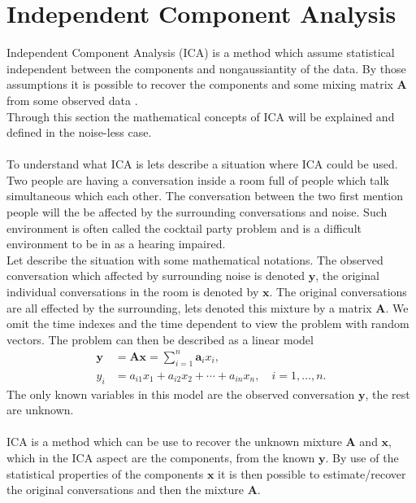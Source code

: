 \section{Independent Component Analysis}\label{sec:ICA}
Independent Component Analysis (ICA) is a method which assume statistical independent between the components and nongaussiantity of the data. By those assumptions it is possible to recover the components and some mixing matrix $\mathbf{A}$ from some observed data \cite[p. 3]{ICA}. 
\\
Through this section the mathematical concepts of ICA will be explained and defined in the noise-less case.
\\ \\
To understand what ICA is lets describe a situation where ICA could be used. Two people are having a conversation inside a room full of people which talk simultaneous which each other. The conversation between the two first mention people will the be affected by the surrounding conversations and noise. Such environment is often called the cocktail party problem and is a difficult environment to be in as a hearing impaired.
\\
Let describe the situation with some mathematical notations. The observed conversation which affected by surrounding noise is denoted $\mathbf{y}$, the original individual conversations in the room is denoted by $\mathbf{x}$. The original conversations are all effected by the surrounding, lets denoted this mixture by a matrix $\mathbf{A}$. We omit the time indexes and the time dependent to view the problem with random vectors. The problem can then be described as a linear model
\begin{align}
\mathbf{y} &= \mathbf{Ax} = \sum_{i=1}^n \mathbf{a}_i x_i,  \label{eq:ICA_1} \\
y_i &= a_{i1} x_1 + a_{i2} x_2 + \cdots + a_{in} x_n, \quad i = 1, \dots, n. \label{eq:ICA_2}
\end{align}
The only known variables in this model are the observed conversation $\mathbf{y}$, the rest are unknown. 
\\ \\
ICA is a method which can be use to recover the unknown mixture $\mathbf{A}$ and $\mathbf{x}$, which in the ICA aspect are the components, from the known $\mathbf{y}$. By use of the statistical properties of the components $\mathbf{x}$ it is then possible to estimate/recover the original conversations and then the mixture $\mathbf{A}$.
